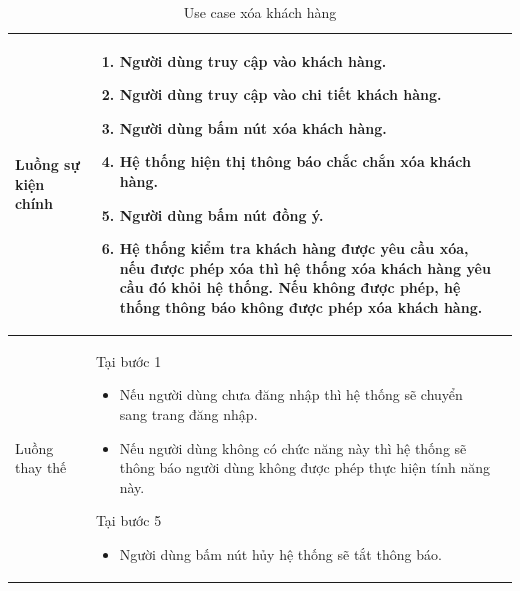 \documentclass[12pt,a4paper]{article}
\begin{document}
\begin{table}[H]
\begin{tabular}{|p{3.5cm}|p{11.5cm}|c|}
            Luồng sự kiện chính & \vspace{-.8cm}\begin{enumerate}
                                                    \item Người dùng truy cập vào khách hàng.
                                                    \item Người dùng truy cập vào chi tiết khách hàng.
                                                    \item  Người dùng bấm nút xóa khách hàng.
                                                    \item  Hệ thống hiện thị thông báo chắc chắn xóa khách hàng.
                                                    \item  Người dùng bấm nút đồng ý.
                                                    \item Hệ thống kiểm tra khách hàng được yêu cầu xóa, nếu được phép xóa thì hệ thống xóa khách hàng yêu cầu đó khỏi hệ thống. Nếu không được phép, hệ thống thông báo không được phép xóa khách hàng.
            \end{enumerate}
            \\
            \hline
            Luồng thay thế & Tại bước 1\newline
            \vspace{-.8cm}\begin{itemize}
                              \item Nếu người dùng chưa đăng nhập thì hệ thống sẽ chuyển sang trang đăng nhập.
                              \item Nếu người dùng không có chức năng này thì hệ thống sẽ thông báo người dùng không được phép thực hiện tính năng này.
            \end{itemize}

            Tại bước 5\newline
            \vspace{-.8cm}\begin{itemize}
                              \item Người dùng bấm nút hủy hệ thống sẽ tắt thông báo.
            \end{itemize} \\
            \hline
        \end{tabular}
        \caption{Use case xóa khách hàng }
    \end{table}

\end{document}
